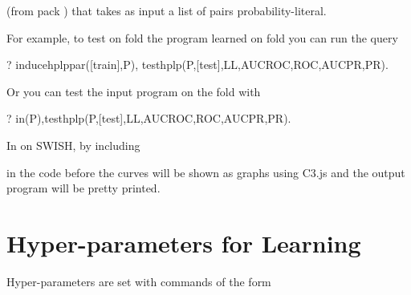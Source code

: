 \documentclass[letterpaper,10pt,english]{sphinxmanual}
\begin{document}
(from pack ) that takes as input a list  of pairs probability-literal.

For example, to test on fold  the program learned on fold  you can run the query

\begin{sphinxVerbatim}[commandchars=\\\{\}]
?\PYGZhy{} induce\PYGZus{}hplp\PYGZus{}par([train],P),
test\PYGZus{}hplp(P,[test],LL,AUCROC,ROC,AUCPR,PR).
\end{sphinxVerbatim}

Or you can test the input program on the fold  with

\begin{sphinxVerbatim}[commandchars=\\\{\}]
?\PYGZhy{} in(P),test\PYGZus{}hplp(P,[test],LL,AUCROC,ROC,AUCPR,PR).
\end{sphinxVerbatim}

In  on SWISH, by including

\begin{sphinxVerbatim}[commandchars=\\\{\}]
 
 
\end{sphinxVerbatim}

in the code before  the curves will be shown as graphs using C3.js and the output program will be pretty printed.


\section{Hyper-parameters for Learning}
\label{\detokenize{index:hyper-parameters-for-learning}}
Hyper-parameters are set with commands of the form

\begin{sphinxVerbatim}[commandchars=\\\{\}]
 
\end{sphinxVerbatim}
\end{document}
